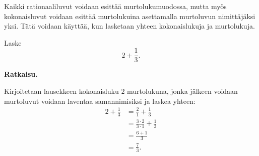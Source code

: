     Kaikki rationaaliluvut voidaan esittää murtolukumuodossa, mutta myös
    kokonaisluvut voidaan esittää murtolukuina asettamalla murtoluvun
    nimittäjäksi yksi. Tätä voidaan käyttää, kun lasketaan yhteen
    kokonaislukuja ja murtolukuja.
    
    \begin{esimerkki}
        Laske
        \[
            2 + \frac{1}{3}.
        \]
        
        \textbf{Ratkaisu.}
        
		Kirjoitetaan lausekkeen kokonaisluku $2$ murtolukuna, jonka
		jälkeen voidaan murtoluvut voidaan laventaa samannimisiksi
		ja laskea yhteen:
        \begin{align*}
           2 + \frac{1}{3} &= \frac{2}{1} + \frac{1}{3}  \\ 
	       				   &= \frac{3 \cdot 2}{3 \cdot 1} + \frac{1}{3} \\ 
	       				   &= \frac{6+1}{3} \\ 
	       				   &= \frac{7}{3}.
        \end{align*}
    \end{esimerkki}
